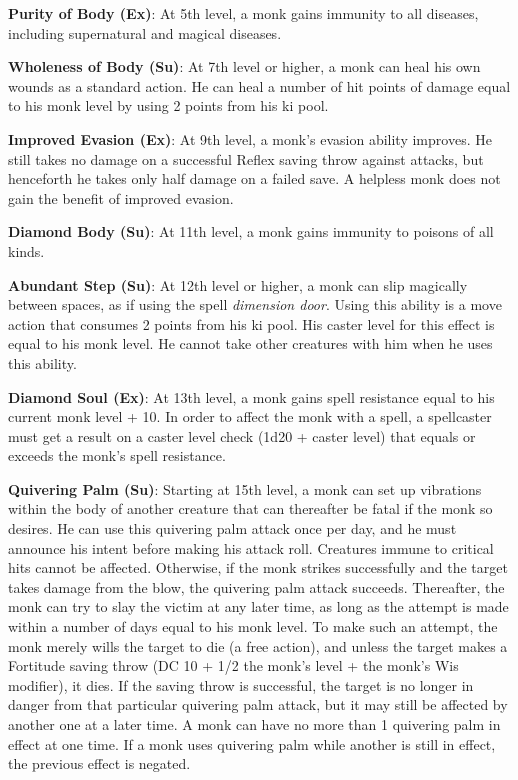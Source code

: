\textbf{Purity of Body (Ex)}: At 5th level, a monk gains immunity to all diseases, including supernatural and magical diseases.
				
\textbf{Wholeness of Body (Su)}: At 7th level or higher, a monk can heal his own wounds as a standard action. He can heal a number of hit points of damage equal to his monk level by using 2 points from his ki pool.
				
\textbf{Improved Evasion (Ex)}: At 9th level, a monk's evasion ability improves. He still takes no damage on a successful Reflex saving throw against attacks, but henceforth he takes only half damage on a failed save. A helpless monk does not gain the benefit of improved evasion.
				
\textbf{Diamond Body (Su)}: At 11th level, a monk gains immunity to poisons of all kinds.
				
\textbf{Abundant Step (Su)}: At 12th level or higher, a monk can slip magically between spaces, as if using the spell \textit{dimension door}. Using this ability is a move action that consumes 2 points from his ki pool. His caster level for this effect is equal to his monk level. He cannot take other creatures with him when he uses this ability.
				
\textbf{Diamond Soul (Ex)}: At 13th level, a monk gains spell resistance equal to his current monk level + 10. In order to affect the monk with a spell, a spellcaster must get a result on a caster level check (1d20 + caster level) that equals or exceeds the monk's spell resistance.
				
\textbf{Quivering Palm (Su)}: Starting at 15th level, a monk can set up vibrations within the body of another creature that can thereafter be fatal if the monk so desires. He can use this quivering palm attack once per day, and he must announce his intent before making his attack roll. Creatures immune to critical hits cannot be affected. Otherwise, if the monk strikes successfully and the target takes damage from the blow, the quivering palm attack succeeds. Thereafter, the monk can try to slay the victim at any later time, as long as the attempt is made within a number of days equal to his monk level. To make such an attempt, the monk merely wills the target to die (a free action), and unless the target makes a Fortitude saving throw (DC 10 + 1/2 the monk's level + the monk's Wis modifier), it dies. If the saving throw is successful, the target is no longer in danger from that particular quivering palm attack, but it may still be affected by another one at a later time. A monk can have no more than 1 quivering palm in effect at one time. If a monk uses quivering palm while another is still in effect, the previous effect is negated.
				
